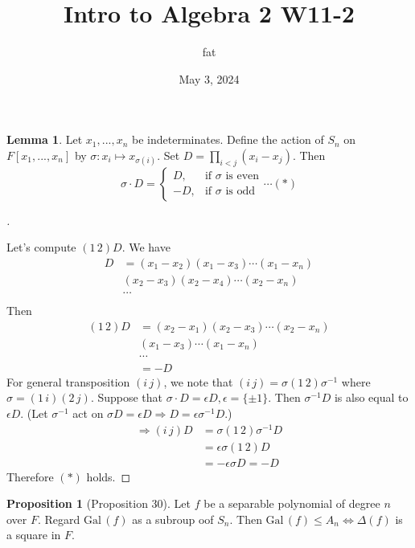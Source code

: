 \documentclass{article}
\title{Intro to Algebra 2 W11-2}
\author{fat}
\date{May 3, 2024}
\theoremstyle{definition}
\newtheorem{lem}{Lemma}
\newtheorem{prop}{Proposition}
\newenvironment{proofs}[1][\proofname]{%
  \begin{proof}[#1]$ $\par\nobreak\ignorespaces
}{%
  \end{proof}
}
\newcommand{\Ra}{\Rightarrow}
\newcommand{\Lra}{\Leftrightarrow}
\newcommand{\Gal}{\text{Gal}\,}
\begin{document}
\maketitle
\thispagestyle{fancy}
\renewcommand{\footrulewidth}{0.4pt}
\cfoot{\thepage}
\renewcommand{\headrulewidth}{0.4pt}

\begin{lem}
	Let $x_1, ..., x_n$ be indeterminates.
	Define the action of $S_n$ on $F[x_1, ..., x_n]$ by $\sigma: x_i \mapsto x_{\sigma(i)}$.
	Set $D = \prod_{i < j} (x_i - x_j)$.
	Then
	\[
		\sigma \cdot D = 
		\begin{cases}
			D, &\text{if } \sigma \text{ is even}\\
			-D, &\text{if } \sigma \text{ is odd}
		\end{cases}
		\cdots (*)
	\]
\end{lem}

\begin{proofs}
	Let's compute $(1 \, 2) D$.
	We have
	\[
		\begin{split}
			D &= (x_1 - x_2) (x_1 - x_3) \cdots (x_1 - x_n)\\
			&(x_2 - x_3) (x_2 - x_4) \cdots (x_2 - x_n)\\
			&\cdots \\
		\end{split}
	\]
	Then 
	\[
		\begin{split}
			(1 \, 2) D &= (x_2 - x_1) (x_2 - x_3) \cdots (x_2 - x_n)\\
			&(x_1 - x_3) \cdots (x_1 - x_n)\\
			&\cdots \\
			&= -D
		\end{split}
	\]
	For general transposition $(i \, j)$, we note that $(i \, j) = \sigma (1 \, 2) \sigma^{-1}$ where $\sigma = (1 \, i) (2 \, j)$.
	Suppose that $\sigma \cdot D = \epsilon D, \epsilon = \{\pm 1\}$.
	Then $\sigma^{-1} D$ is also equal to $\epsilon D$.
	(Let $\sigma^{-1}$ act on $\sigma D = \epsilon D \Ra D = \epsilon \sigma^{-1} D$.)
	\[
		\begin{split}
			\Ra (i \, j) D &= \sigma (1 \, 2) \sigma^{-1} D\\
			&= \epsilon \sigma (1 \, 2) D\\
			&= - \epsilon \sigma D = -D
		\end{split}
	\]
	Therefore $(*)$ holds.
\end{proofs}

\begin{prop}[Proposition 30]
	Let $f$ be a separable polynomial of degree $n$ over $F$.
	Regard $\Gal(f)$ as a subroup oof $S_n$.
	Then $\Gal(f) \leq A_n \Lra \Delta(f)$ is a square in $F$.
\end{prop}
\end{document}
